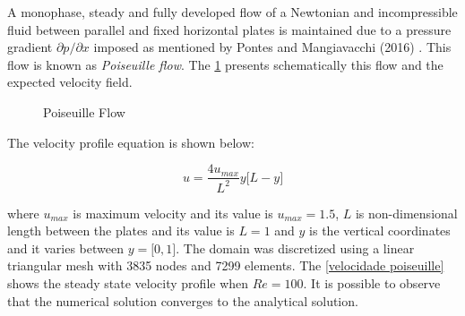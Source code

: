 A monophase, steady and fully developed flow of a Newtonian 
and incompressible fluid between parallel and fixed horizontal 
plates is maintained due to a pressure gradient 
$\partial p/ \partial x$ imposed as mentioned by Pontes 
and Mangiavacchi (2016) \cite{pontes2016}. 
This flow is known as \textit{Poiseuille flow}. 
The \ref{poiseuille} presents schematically this flow and 
the expected velocity field.

\begin{figure}[H]
\caption{Poiseuille Flow}
\begin{center}
\end{center}
\label{poiseuille}
\end{figure}

\noindent
The velocity profile equation is shown below:

\begin{equation}
 u = \frac{4 u_{max}}{L^2} y \big[ L - y \big]
\end{equation}

\medskip
\noindent
where $u_{max}$ is maximum velocity and its value is 
$u_{max} = 1.5$, $L$ is non-dimensional length 
between the plates and its value is 
$L = 1$
and $y$ is the vertical coordinates and it varies 
between $y = \big[ 0,1 \big]$.
The domain was discretized using a linear triangular mesh
with 3835 nodes and 7299 elements.
The \ref{velocidade poiseuille} shows the steady state velocity profile
when $Re=100$.
It is possible to observe that the numerical
solution converges to the analytical solution.

